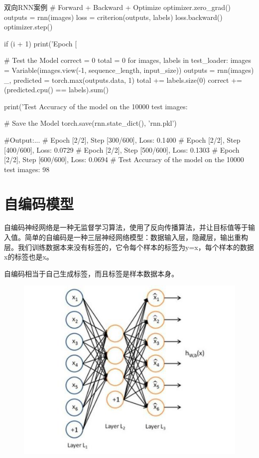 \documentclass[openbib]{article}
\begin{document}
\begin{Python}{双向RNN案例}
# Forward + Backward + Optimize
optimizer.zero_grad()
outputs = rnn(images)
loss = criterion(outputs, labels)
loss.backward()
optimizer.step()

if (i + 1) %
	print('Epoch [%

# Test the Model
correct = 0
total = 0
for images, labels in test_loader:
	images = Variable(images.view(-1, sequence_length, input_size))
	outputs = rnn(images)
	_, predicted = torch.max(outputs.data, 1)
	total += labels.size(0)
	correct += (predicted.cpu() == labels).sum()

print('Test Accuracy of the model on the 10000 test images: %

# Save the Model
torch.save(rnn.state_dict(), 'rnn.pkl')

#Output:...
#       Epoch [2/2], Step [300/600], Loss: 0.1400
#       Epoch [2/2], Step [400/600], Loss: 0.0729
#       Epoch [2/2], Step [500/600], Loss: 0.1303
#       Epoch [2/2], Step [600/600], Loss: 0.0694
#       Test Accuracy of the model on the 10000 test images: 98 %
\end{Python}
\section{自编码模型}

自编码神经网络是一种无监督学习算法，使用了反向传播算法，并让目标值等于输入值。简单的自编码是一种三层神经网络模型：数据输入层，隐藏层，输出重构层。我们训练数据本来没有标签的，它令每个样本的标签为y=x，每个样本的数据x的标签也是x。

自编码相当于自己生成标签，而且标签是样本数据本身。

\begin{figure}[htbp]
	\centering
	\includegraphics[scale=0.4]{自编码模型内部结构}
\end{figure}
\end{document}

